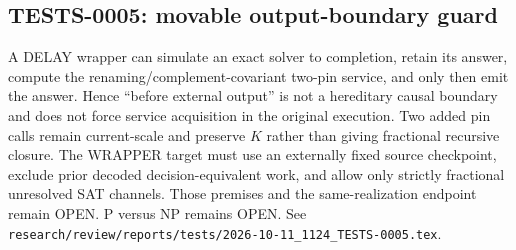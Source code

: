 \subsection*{TESTS-0005: movable output-boundary guard}
A DELAY wrapper can simulate an exact solver to completion, retain its answer,
compute the renaming/complement-covariant two-pin service, and only then emit
the answer.  Hence ``before external output'' is not a hereditary causal
boundary and does not force service acquisition in the original execution.
Two added pin calls remain current-scale and preserve $K$ rather than giving
fractional recursive closure.  The WRAPPER target must use an externally
fixed source checkpoint, exclude prior decoded decision-equivalent work, and
allow only strictly fractional unresolved SAT channels.  Those premises and
the same-realization endpoint remain OPEN.  P versus NP remains OPEN.  See
\texttt{research/review/reports/tests/2026-10-11\_1124\_TESTS-0005.tex}.
